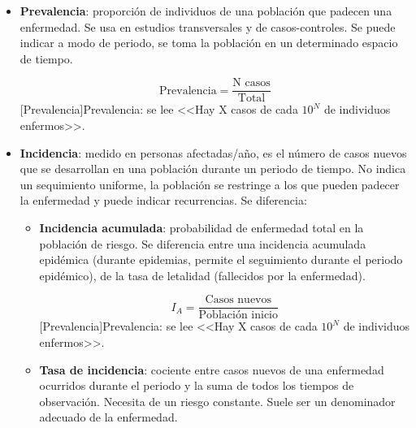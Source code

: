 \begin{itemize}[itemsep=0pt,parsep=0pt,topsep=0pt,partopsep=0pt]
	\begin{center}
		\begin{equation}
		\mbox{Tasa} = \dfrac{A}{B\left(\frac{\mbox{udd}}{\mbox{tiempo}}\right)}
		\end{equation}
		{Tasa: se lee <<El X \% de los expuestos han desarrollado Y en Z tiempo>>.}
	\end{center}
	\item\textbf{Prevalencia}: proporción de individuos de una población que padecen una enfermedad. Se usa en estudios transversales y de casos-controles. Se puede indicar a modo de periodo, se toma la población en un determinado espacio de tiempo.
	\begin{center}
		\begin{equation}
		\mbox{Prevalencia} = \dfrac{\mbox{N casos}}{\mbox{Total}}
		\end{equation}
		[Prevalencia]{Prevalencia: se lee <<Hay X casos de cada $10^N$ de individuos enfermos>>.}
	\end{center}
	\item\textbf{Incidencia}: medido en personas afectadas/año, es el número de casos nuevos que se desarrollan en una población durante un periodo de tiempo. No indica un sequimiento uniforme, la población se restringe a los que pueden padecer la enfermedad y puede indicar recurrencias. Se diferencia:
	\begin{itemize}[itemsep=0pt,parsep=0pt,topsep=0pt,partopsep=0pt]
		\item \textbf{Incidencia acumulada}: probabilidad de enfermedad total en la población de riesgo. Se diferencia entre una incidencia acumulada epidémica (durante epidemias, permite el seguimiento durante el periodo epidémico), de la tasa de letalidad (fallecidos por la enfermedad).
		\begin{center}
			\begin{equation}
			I_A = \dfrac{\mbox{Casos nuevos}}{\mbox{Población inicio}}
			\end{equation}
			[Prevalencia]{Prevalencia: se lee <<Hay X casos de cada $10^N$ de individuos enfermos>>.}
		\end{center}
		\item\textbf{Tasa de incidencia}: cociente entre casos nuevos de una enfermedad ocurridos durante el periodo y la suma de todos los tiempos de observación. Necesita de un riesgo constante. Suele ser un denominador adecuado de la enfermedad.
		\begin{center}

\end{center}
\end{itemize}
\end{itemize}
